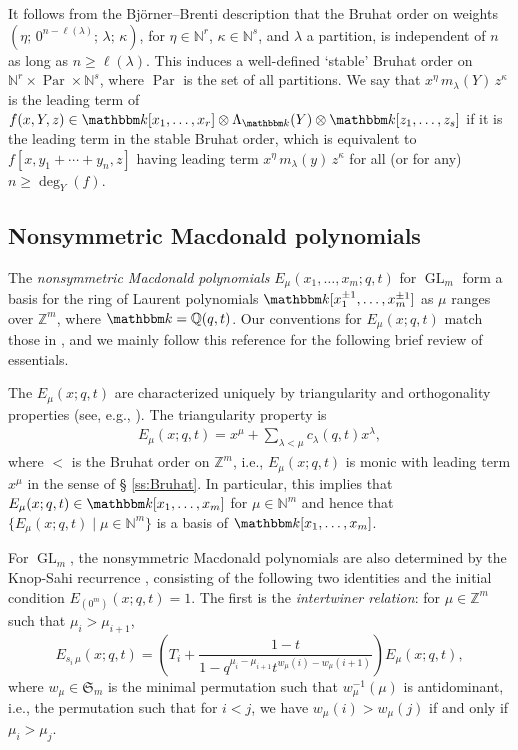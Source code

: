 \documentclass[12pt]{amsart}
\theoremstyle{definition}
\theoremstyle{remark}
\newcommand{\NN}{{\mathbb N}}
\newcommand{\QQ}{{\mathbb Q}}
\newcommand{\ZZ}{{\mathbb Z}}
\newcommand{\kk}{{\mathbbm k}}
\newcommand{\Sfrak}{{\mathfrak S}}
\DeclareMathOperator{\GL}{GL}
\begin{document}
It follows from the Bj\"orner--Brenti description that the Bruhat
order on weights $(\eta ;\, 0^{n-\ell (\lambda )};\, \lambda ;\,
\kappa )$, for $\eta \in \NN ^{r}$, $\kappa \in \NN ^{s}$, and
$\lambda $ a partition, is independent of $n$ as long as $n\geq \ell
(\lambda )$.  This induces a well-defined `stable' Bruhat order on
$\NN ^{r}\times \operatorname{Par}\times \NN ^{s}$, where
$\operatorname{Par}$ is the set of all partitions.  We say that
$x^{\eta } \, m_{\lambda }(Y) \, z^{\kappa }$ is the leading term of
$f(x,Y,z)\in \kk [x_{1},\ldots,x_{r}]\otimes \Lambda _{\kk }(Y)\otimes
\kk [z_{1},\ldots,z_{s}]$ if it is the leading term in the stable
Bruhat order, which is equivalent to $f[x,y_{1}+\cdots +y_{n},z]$
having leading term $x^{\eta } \, m_{\lambda }(y) \, z^{\kappa }$ for
all (or for any) $n\geq \deg _{Y}(f)$.


\subsection{Nonsymmetric Macdonald polynomials}
\label{ss:ns-Macs}

The \emph{nonsymmetric Macdonald polynomials} $E_{\mu }(x_1,\dots,
x_m;q,t)$ for $\GL_m$ form a basis for the ring of Laurent polynomials
$\kk[x_1^{\pm 1}, \dots, x_m^{\pm 1}]$ as $\mu$ ranges over $\ZZ^{m}$,
where $\kk = \QQ(q,t)$.  Our conventions for $E_\mu(x;q,t)$ match
those in \cite{HagHaiLo08}, and we mainly follow this reference for
the following brief review of essentials.

The $E_\mu(x;q,t)$ are characterized uniquely by triangularity and
orthogonality properties (see, e.g., \cite[\S 2.1]{HagHaiLo08}).  The
triangularity property is
\begin{align}
E_{\mu }(x;q,t) = x^{\mu } + \sum _{\lambda
<\mu } c_{\lambda }(q,t) x^{\lambda },
\end{align}
where $<$ is the Bruhat order on $\ZZ ^{m}$, i.e., $E_{\mu }(x;q,t)$
is monic with leading term $x^{\mu }$ in the sense of \S
\ref{ss:Bruhat}.  In particular, this implies that $E_{\mu }(x;q,t)\in
\kk [x_{1},\ldots,x_{m}]$ for $\mu \in \NN ^{m}$ and hence that $\{
E_{\mu }(x;q,t)\mid \mu \in \NN ^{m} \}$ is a basis of $\kk
[x_{1},\ldots,x_{m}]$.

For $\GL _{m}$, the nonsymmetric Macdonald polynomials are also
determined by the Knop-Sahi recurrence \cite{Knop97,
Sahiinterpolation}, consisting of the following two identities and the
initial condition $E_{(0^m)}(x;q,t) = 1$.  The first is the
\emph{intertwiner relation}: for $\mu \in \ZZ ^{m}$ such that $\mu
_{i}>\mu _{i+1}$,
\begin{equation}\label{e:intertwiner}
E_{s_{i}\, \mu }(x;q,t) = \left(T_{i} + \frac{1-t}{1-q^{\mu _{i}-\mu
_{i+1}} t^{w_{\mu }(i) - w_{\mu }(i+1)}} \right) E_{\mu }(x;q,t),
\end{equation}
where $w_{\mu }\in \Sfrak _{m}$ is the minimal permutation such that
$w_{\mu }^{-1}(\mu )$ is antidominant, i.e., the permutation such that
for $i<j$, we have $w_{\mu }(i)>w_{\mu }(j)$ if and only if $\mu
_{i}>\mu _{j}$.
\end{document}
